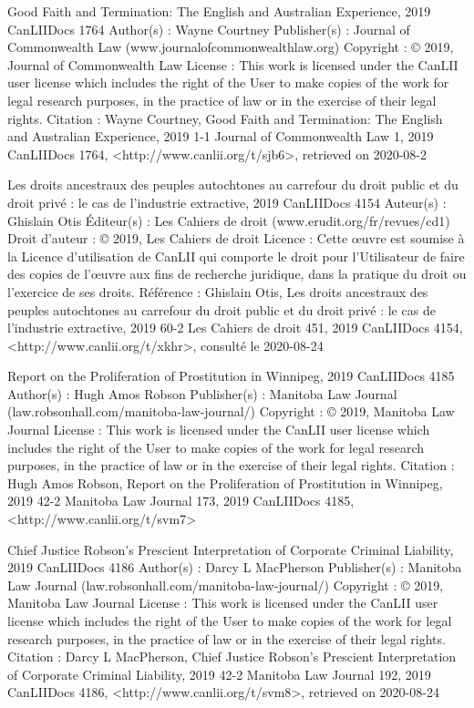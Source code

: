 Good Faith and Termination: The English and Australian Experience, 2019 CanLIIDocs 1764
Author(s) : 	Wayne Courtney
Publisher(s) : 	Journal of Commonwealth Law (www.journalofcommonwealthlaw.org)
Copyright : 	© 2019, Journal of Commonwealth Law
License : 	This work is licensed under the CanLII user license which includes the right of the User to make copies of the work for legal research purposes, in the practice of law or in the exercise of their legal rights.
Citation : 	Wayne Courtney, Good Faith and Termination: The English and Australian Experience, 2019 1-1 Journal of Commonwealth Law 1, 2019 CanLIIDocs 1764, <http://www.canlii.org/t/sjb6>, retrieved on 2020-08-2


Les droits ancestraux des peuples autochtones au carrefour du droit public et du droit privé : le cas de l’industrie extractive, 2019 CanLIIDocs 4154
Auteur(s) : 	Ghislain Otis
Éditeur(s) : 	Les Cahiers de droit (www.erudit.org/fr/revues/cd1)
Droit d'auteur : 	© 2019, Les Cahiers de droit
Licence : 	Cette œuvre est soumise à la Licence d’utilisation de CanLII qui comporte le droit pour l’Utilisateur de faire des copies de l’œuvre aux fins de recherche juridique, dans la pratique du droit ou l’exercice de ses droits.
Référence : 	Ghislain Otis, Les droits ancestraux des peuples autochtones au carrefour du droit public et du droit privé : le cas de l’industrie extractive, 2019 60-2 Les Cahiers de droit 451, 2019 CanLIIDocs 4154, <http://www.canlii.org/t/xkhr>, consulté le 2020-08-24


Report on the Proliferation of Prostitution in Winnipeg, 2019 CanLIIDocs 4185
Author(s) : 	Hugh Amos Robson
Publisher(s) : 	Manitoba Law Journal (law.robsonhall.com/manitoba-law-journal/)
Copyright : 	© 2019, Manitoba Law Journal
License : 	This work is licensed under the CanLII user license which includes the right of the User to make copies of the work for legal research purposes, in the practice of law or in the exercise of their legal rights.
Citation : 	Hugh Amos Robson, Report on the Proliferation of Prostitution in Winnipeg, 2019 42-2 Manitoba Law Journal 173, 2019 CanLIIDocs 4185, <http://www.canlii.org/t/svm7>

Chief Justice Robson’s Prescient Interpretation of Corporate Criminal Liability, 2019 CanLIIDocs 4186
Author(s) : 	Darcy L MacPherson
Publisher(s) : 	Manitoba Law Journal (law.robsonhall.com/manitoba-law-journal/)
Copyright : 	© 2019, Manitoba Law Journal
License : 	This work is licensed under the CanLII user license which includes the right of the User to make copies of the work for legal research purposes, in the practice of law or in the exercise of their legal rights.
Citation : 	Darcy L MacPherson, Chief Justice Robson’s Prescient Interpretation of Corporate Criminal Liability, 2019 42-2 Manitoba Law Journal 192, 2019 CanLIIDocs 4186, <http://www.canlii.org/t/svm8>, retrieved on 2020-08-24


